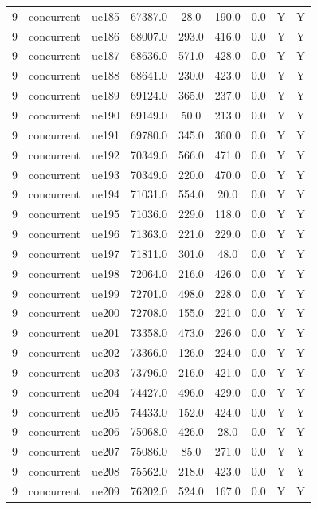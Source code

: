 \begin{table}[ht]
\begin{tabular}{|c|c|c|c|c|c|c|c|c|}
9 & concurrent & ue185 & 67387.0 & 28.0 & 190.0 & 0.0 & Y & Y \\
9 & concurrent & ue186 & 68007.0 & 293.0 & 416.0 & 0.0 & Y & Y \\
9 & concurrent & ue187 & 68636.0 & 571.0 & 428.0 & 0.0 & Y & Y \\
9 & concurrent & ue188 & 68641.0 & 230.0 & 423.0 & 0.0 & Y & Y \\
9 & concurrent & ue189 & 69124.0 & 365.0 & 237.0 & 0.0 & Y & Y \\
9 & concurrent & ue190 & 69149.0 & 50.0 & 213.0 & 0.0 & Y & Y \\
9 & concurrent & ue191 & 69780.0 & 345.0 & 360.0 & 0.0 & Y & Y \\
9 & concurrent & ue192 & 70349.0 & 566.0 & 471.0 & 0.0 & Y & Y \\
9 & concurrent & ue193 & 70349.0 & 220.0 & 470.0 & 0.0 & Y & Y \\
9 & concurrent & ue194 & 71031.0 & 554.0 & 20.0 & 0.0 & Y & Y \\
9 & concurrent & ue195 & 71036.0 & 229.0 & 118.0 & 0.0 & Y & Y \\
9 & concurrent & ue196 & 71363.0 & 221.0 & 229.0 & 0.0 & Y & Y \\
9 & concurrent & ue197 & 71811.0 & 301.0 & 48.0 & 0.0 & Y & Y \\
9 & concurrent & ue198 & 72064.0 & 216.0 & 426.0 & 0.0 & Y & Y \\
9 & concurrent & ue199 & 72701.0 & 498.0 & 228.0 & 0.0 & Y & Y \\
9 & concurrent & ue200 & 72708.0 & 155.0 & 221.0 & 0.0 & Y & Y \\
9 & concurrent & ue201 & 73358.0 & 473.0 & 226.0 & 0.0 & Y & Y \\
9 & concurrent & ue202 & 73366.0 & 126.0 & 224.0 & 0.0 & Y & Y \\
9 & concurrent & ue203 & 73796.0 & 216.0 & 421.0 & 0.0 & Y & Y \\
9 & concurrent & ue204 & 74427.0 & 496.0 & 429.0 & 0.0 & Y & Y \\
9 & concurrent & ue205 & 74433.0 & 152.0 & 424.0 & 0.0 & Y & Y \\
9 & concurrent & ue206 & 75068.0 & 426.0 & 28.0 & 0.0 & Y & Y \\
9 & concurrent & ue207 & 75086.0 & 85.0 & 271.0 & 0.0 & Y & Y \\
9 & concurrent & ue208 & 75562.0 & 218.0 & 423.0 & 0.0 & Y & Y \\
9 & concurrent & ue209 & 76202.0 & 524.0 & 167.0 & 0.0 & Y & Y \\

\end{tabular}
\end{table}
